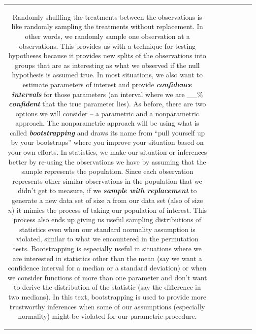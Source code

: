 \documentclass[]{book}
\newenvironment{Shaded}{\begin{snugshade}}{\end{snugshade}}
\theoremstyle{definition}
\theoremstyle{definition}
\theoremstyle{remark}
\begin{document}
\begin{longtable}[]{@{}ccccccc@{}}
\begin{minipage}[b]{0.10\columnwidth}
\begin{Shaded}
\begin{Highlighting}[]
\begin{Shaded}
\begin{Highlighting}[]
\begin{enumerate}
Randomly shuffling the treatments between the observations is like
randomly sampling the treatments without replacement. In other words, we
randomly sample one observation at a observations. This provides us with
a technique for testing hypotheses because it provides new splits of the
observations into groups that are as interesting as what we observed if
the null hypothesis is assumed true. In most situations, we also want to
estimate parameters of interest and provide \textbf{\emph{confidence
intervals}} for those parameters (an interval where we are \_\_\%
\textbf{\emph{confident}} that the true parameter lies). As before,
there are two options we will consider -- a parametric and a
nonparametric approach. The nonparametric approach will be using what is
called \textbf{\emph{bootstrapping}} and draws its name from ``pull
yourself up by your bootstraps'' where you improve your situation based
on your own efforts. In statistics, we make our situation or inferences
better by re-using the observations we have by assuming that the sample
represents the population. Since each observation represents other
similar observations in the population that we didn't get to measure, if
we \textbf{\emph{sample with replacement}} to generate a new data set of
size \emph{n} from our data set (also of size \emph{n}) it mimics the
process of taking our population of interest. This process also ends up
giving us useful sampling distributions of statistics even when our
standard normality assumption is violated, similar to what we
encountered in the permutation tests. Bootstrapping is especially useful
in situations where we are interested in statistics other than the mean
(say we want a confidence interval for a median or a standard deviation)
or when we consider functions of more than one parameter and don't want
to derive the distribution of the statistic (say the difference in two
medians). In this text, bootstrapping is used to provide more
trustworthy inferences when some of our assumptions (especially
normality) might be violated for our parametric procedure.


\end{enumerate}
\end{Highlighting}
\end{Shaded}
\end{Highlighting}
\end{Shaded}
\end{minipage}
\end{longtable}
\end{document}
